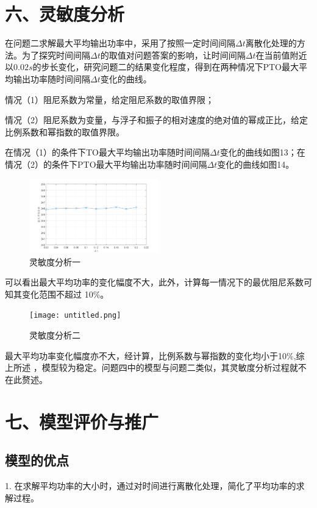 \documentclass{my_paper}
\begin{document}
\section{六、灵敏度分析}

在问题二求解最大平均输出功率中，采用了按照一定时间间隔$\Delta t$离散化处理的方法。为了探究时间间隔$\Delta t$的取值对问题答案的影响，让时间间隔$\Delta t$在当前值附近以$0.02s$的步长变化，研究问题二的结果变化程度，得到在两种情况下PTO最大平均输出功率随时间间隔$\Delta t$变化的曲线。

情况（1）阻尼系数为常量，给定阻尼系数的取值界限；

情况（2）阻尼系数为变量，与浮子和振子的相对速度的绝对值的幂成正比，给定比例系数和幂指数的取值界限。

在情况（1）的条件下TO最大平均输出功率随时间间隔$\Delta t$变化的曲线如图13；在情况（2）的条件下PTO最大平均输出功率随时间间隔$\Delta t$变化的曲线如图14。


\begin{figure}[!h]
    \centering
    \includegraphics[width=0.5\textwidth]{灵敏度一.png}
    \caption{灵敏度分析一}
    \label{linyi}
\end{figure}

可以看出最大平均功率的变化幅度不大，此外，计算每一情况下的最优阻尼系数可知其变化范围不超过
10\%。


\begin{figure}[!h]
    \centering
    \texttt{[image: untitled.png]}
    \caption{灵敏度分析二}
    \label{liner}
\end{figure}

最大平均功率变化幅度亦不大，经计算，比例系数与幂指数的变化均小于10\%,综上所述
，模型较为稳定。问题四中的模型与问题二类似，其灵敏度分析过程就不在此赘述。





\section{七、模型评价与推广}

\subsection{模型的优点}
1. 在求解平均功率的大小时，通过对时间进行离散化处理，简化了平均功率的求解过程。
\end{document}
